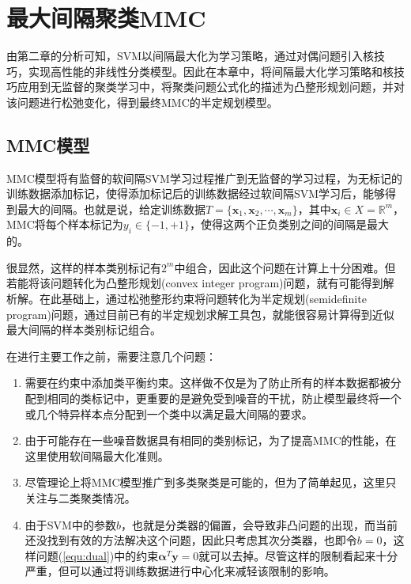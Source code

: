 \chapter{最大间隔聚类MMC}
由第二章的分析可知，SVM以间隔最大化为学习策略，通过对偶问题引入核技巧，实现高性能的非线性分类模型。因此在本章中，将间隔最大化学习策略和核技巧应用到无监督的聚类学习中，将聚类问题公式化的描述为凸整形规划问题，并对该问题进行松弛变化，得到最终MMC的半定规划模型。

\section{MMC模型}
MMC模型将有监督的软间隔SVM学习过程推广到无监督的学习过程，为无标记的训练数据添加标记，使得添加标记后的训练数据经过软间隔SVM学习后，能够得到最大的间隔。也就是说，给定训练数据$T=\{\mathbf{x}_1,\mathbf{x}_2,\cdots,\mathbf{x}_m\}$，其中$\mathbf{x}_i\in X = \mathbb{R}^m$，MMC将每个样本标记为$y_i\in \{-1,+1\}$，使得这两个正负类别之间的间隔是最大的。

很显然，这样的样本类别标记有$2^m$中组合，因此这个问题在计算上十分困难。但若能将该问题转化为凸整形规划(convex integer program)问题，就有可能得到解析解。在此基础上，通过松弛整形约束将问题转化为半定规划(semidefinite program)问题，通过目前已有的半定规划求解工具包，就能很容易计算得到近似最大间隔的样本类别标记组合。

在进行主要工作之前，需要注意几个问题：
\begin{enumerate}[fullwidth,itemindent=24pt]
  \item 需要在约束中添加类平衡约束。这样做不仅是为了防止所有的样本数据都被分配到相同的类标记中，更重要的是避免受到噪音的干扰，防止模型最终将一个或几个特异样本点分配到一个类中以满足最大间隔的要求。
  \item 由于可能存在一些噪音数据具有相同的类别标记，为了提高MMC的性能，在这里使用软间隔最大化准则。
  \item 尽管理论上将MMC模型推广到多类聚类是可能的，但为了简单起见，这里只关注与二类聚类情况。
  \item 由于SVM中的参数$b$，也就是分类器的偏置，会导致非凸问题的出现，而当前还没找到有效的方法解决这个问题，因此只考虑其次分类器，也即令$b=0$，这样问题(\ref{equ:dual})中的约束$\mathbf{\alpha}^T\mathbf{y}=0$就可以去掉。尽管这样的限制看起来十分严重，但可以通过将训练数据进行中心化来减轻该限制的影响。
  \end{enumerate}

